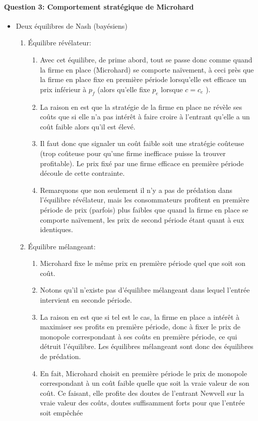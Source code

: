\documentclass[notes, ignorenonframetext, compress, 9pt, xcolor=svgnames, aspectratio=169]{beamer}
\begin{document}
\begin{frame}
  [allowframebreaks]{\insertsection}
  \framesubtitle{Question 3: Comportement stratégique de Microhard}
  \begin{itemize}
    \item Deux équilibres de Nash (bayésiens)
\begin{enumerate}
  \item Équilibre révélateur:
  \begin{enumerate}[$\cdot$]
    \item Avec cet équilibre, de prime abord, tout se passe donc comme 
    quand la firme en place (Microhard)  se comporte naïvement, 
    à ceci près que la firme en place fixe en première période lorsqu’elle est efficace un prix inférieur à $p_f$ (alors qu’elle fixe $p_e$ lorsque $c = c_e$ ).
    \item La raison en est que la stratégie de la firme en place ne révèle ses coûts que si elle n’a pas intérêt à faire croire à l’entrant qu’elle a un coût faible alors qu’il est élevé.
    \item Il faut donc que signaler un coût faible soit une stratégie coûteuse (trop coûteuse pour qu’une firme inefficace puisse la trouver profitable). Le prix fixé par une firme 
    efficace en première période découle de cette contrainte.
    \item Remarquons que non seulement il n’y a pas de prédation 
    dans l’équilibre révélateur, mais les consommateurs profitent en première période de prix (parfois) plus faibles que quand la firme en place se comporte naïvement, les prix de second période étant quant à eux identiques.
  \end{enumerate}

  \framebreak

  \item Équilibre mélangeant:
  \begin{enumerate}[$\cdot$]
    \item Microhard fixe le même prix en première période quel que soit son coût. 
\item Notons qu’il n’existe pas d’équilibre mélangeant dans lequel l’entrée intervient en seconde période.
\item La raison en est que si tel est le cas, la firme en place a intérêt à maximiser ses profits en première période, donc à fixer le prix de monopole correspondant à ses coûts en première période, ce qui détruit l’équilibre. Les équilibres mélangeant sont donc des équilibres de prédation.
\item En fait, Microhard choisit en première période le prix de monopole correspondant à un coût faible quelle que soit la vraie valeur de son coût. Ce faisant, elle profite des doutes de l’entrant Newvell sur la vraie valeur des coûts, doutes suffisamment forts pour que l’entrée soit empêchée
  \end{enumerate}
\end{enumerate}
  \end{itemize}
\end{frame}  
\end{document}
